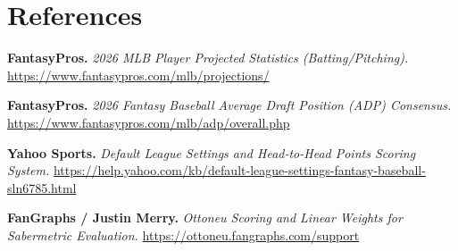 \documentclass[11pt,a4paper]{article}
\begin{document}
\section*{References}

{\small
\begin{sloppypar}
\begin{enumerate}[label={[\arabic*]}, leftmargin=2em, itemsep=2pt]
    \item \label{ref:fantasypros-proj}\textbf{FantasyPros.} \textit{2026 MLB Player Projected Statistics (Batting/Pitching).} \url{https://www.fantasypros.com/mlb/projections/}
    \item \label{ref:fantasypros-adp}\textbf{FantasyPros.} \textit{2026 Fantasy Baseball Average Draft Position (ADP) Consensus.} \url{https://www.fantasypros.com/mlb/adp/overall.php}
    \item \label{ref:yahoo-scoring}\textbf{Yahoo Sports.} \textit{Default League Settings and Head-to-Head Points Scoring System.} \url{https://help.yahoo.com/kb/default-league-settings-fantasy-baseball-sln6785.html}
    \item \label{ref:fangraphs-scoring}\textbf{FanGraphs / Justin Merry.} \textit{Ottoneu Scoring and Linear Weights for Sabermetric Evaluation.} \url{https://ottoneu.fangraphs.com/support}
\end{enumerate}
\end{sloppypar}
}
\end{document}
